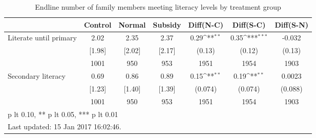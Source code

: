\begin{table}[htbp]\centering
\def\sym#1{\ifmmode^{#1}\else\(^{#1}\)\fi}
\caption{Endline number of family members meeting literacy levels by treatment group \label{tab:"balance"}}
\begin{tabular*}{1\hsize}{@{\hskip\tabcolsep\extracolsep\fill}l*{1}{cccccc}}
\toprule
                                &  Control&   Normal&  Subsidy&Diff(N-C)         &Diff(S-C)         &Diff(S-N)         \\
\midrule
Literate until primary          &     2.02&     2.35&     2.37&     0.29\sym{**} &     0.35\sym{***}&   -0.032         \\
                                &   [1.98]&   [2.02]&   [2.17]&   (0.13)         &   (0.12)         &   (0.13)         \\
                                &     1001&      950&      953&     1951         &     1954         &     1903         \\
Secondary literacy              &     0.69&     0.86&     0.89&     0.15\sym{**} &     0.19\sym{**} &   0.0023         \\
                                &   [1.23]&   [1.40]&   [1.39]&  (0.074)         &  (0.074)         &  (0.088)         \\
                                &     1001&      950&      953&     1951         &     1954         &     1903         \\
\bottomrule
\multicolumn{7}{l}{\footnotesize * p lt 0.10, ** p lt 0.05, *** p lt 0.01}\\
\multicolumn{7}{l}{\footnotesize Last updated: 15 Jan 2017 16:02:46.}\\
\end{tabular*}
\end{table}

